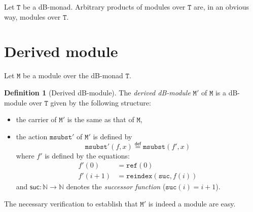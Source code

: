 \documentclass[a4paper,twoside,12pt]{article}
\theoremstyle{definition}
\newtheorem{definition}{Definition}
\theoremstyle{remark}
\newcommand{\NN}{\mathbb{N}}
\newcommand{\refe}{\mathtt{ref}}
\newcommand{\reindex}{\mathtt{reindex}}
\newcommand{\TT}{\mathtt{T}}
\newcommand{\MM}{\mathtt{M}}
\newcommand{\msubst}{\mathtt{msubst}}
\begin{document}
Let $\TT$ be a dB-monad.  Arbitrary products of modules over $\TT$
are, in an obvious way, modules over $\TT$.

\section{Derived module}
\label{sec:derived-module}

Let $\MM$ be a module over the dB-monad $\TT$.

\begin{definition}[Derived dB-module]
  The \emph{derived dB-module} $\MM'$ of $\MM$ is a dB-module over
  $\TT$ given by the following structure:
  \begin{itemize}
  \item the carrier of $\MM'$ is the same as that of $\MM$,
  \item the action $\msubst'$ of $\MM'$ is defined by
    \begin{equation*}
    \msubst'(f,x) \stackrel{\mathsf{def}}{=} \msubst(f',x)
  \end{equation*}
  where $f'$ is defined by the equations:
  \begin{align*}
    f'(0) &= \refe(0)\\
    f'(i+1) &= \reindex(\mathtt{suc},f(i))
  \end{align*}
  and $\mathsf{suc} \colon \NN \to \NN$ denotes the \emph{successor
    function} ($\mathtt{suc}(i) = i+1$).
  \end{itemize}
\end{definition}

The necessary verification to establish that $\MM'$ is indeed a module
are easy.
\end{document}
